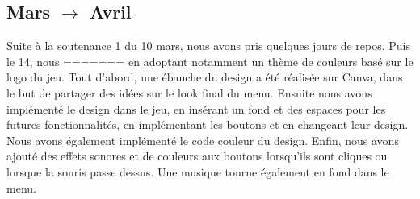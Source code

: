 \documentclass[a4paper,12pt]{article}
\begin{document}
        \subsection{Mars $\to$ Avril}
            Suite à la soutenance 1 du 10 mars, nous avons pris quelques jours de repos. Puis le 14, nous
=======
                en adoptant notamment un thème de couleurs basé sur le logo du jeu. Tout d'abord, une
                ébauche du design a été réalisée sur Canva, dans le but de partager des idées sur le look
                final du menu. Ensuite nous avons implémenté le design dans le jeu, en insérant un fond
                et des espaces pour les futures fonctionnalités, en implémentant les boutons et en changeant
                leur design. Nous avons également implémenté le code couleur du design. Enfin, nous avons 
                ajouté des effets sonores et de couleurs aux boutons lorsqu'ils sont cliques ou lorsque
                la souris passe dessus. Une musique tourne également en fond dans le menu.
\end{document}
